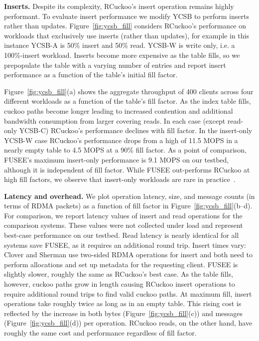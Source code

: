\textbf{Inserts.}
Despite its complexity, RCuckoo's insert operation remains highly
performant.  To evaluate insert performance we modify YCSB to perform
inserts rather than updates.  Figure~\ref{fig:ycsb_fill} considers
RCuckoo's performance on workloads that exclusively use inserts (rather than
updates), for example in this instance YCSB-A is 50\% insert and 50\%
read. YCSB-W is write only, i.e. a 100\%-insert workload.  Inserts become
more expensive as the table fills, so we prepopulate the table with a varying number of entries and report insert performance as
a function of the table's initial fill factor.

Figure~\ref{fig:ycsb_fill}(a) shows the aggregate throughput of 400
clients across four different workloads as a function of the table's
fill factor.  As the index table fills, cuckoo paths become longer
leading to increased contention and additional bandwidth consumption
from larger covering reads. In each case (except read-only YCSB-C)
RCuckoo's performance declines with fill factor. In the insert-only
YCSB-W case RCuckoo's performance drops from a high of 11.5 MOPS in a
nearly empty table to 4.5 MOPS at a 90\% fill factor.  As a point of
comparison, FUSEE's maximum insert-only performance is 9.1 MOPS on our
testbed, although it is independent of fill factor.  While FUSEE
out-performs RCuckoo at high fill factors, we observe that 
insert-only workloads are rare in
practice~\cite{facebook-memcached}.

\textbf{Latency and overhead.}
We plot operation latency, size, and message counts (in
terms of RDMA packets) as a function of fill factor in
Figure~\ref{fig:ycsb_fill}(b--d).  For comparison, we report
latency values of insert and read operations for the
comparison systems. These values were not collected under
load and represent best-case performance on our testbed.
Read latency is nearly identical for all systems save FUSEE,
as it requires an additional round trip.  Insert times vary:
Clover and Sherman use two-sided RDMA operations for insert
and both need to perform allocations and set up metadata for
the requesting client.  FUSEE is slightly slower, roughly
the same as RCuckoo's best case.  As the table fills,
however, cuckoo paths grow in length causing RCuckoo insert
operations to require additional round trips to find valid
cuckoo paths.  At maximum fill, insert operations take
roughly twice as long as in an empty table. This rising cost
is reflected by the increase in both bytes (Figure~\ref{fig:ycsb_fill}(c)) and messages (Figure~\ref{fig:ycsb_fill}(d)) per
operation.  RCuckoo reads, on the other hand, have roughly
the same cost and performance regardless of fill factor.


